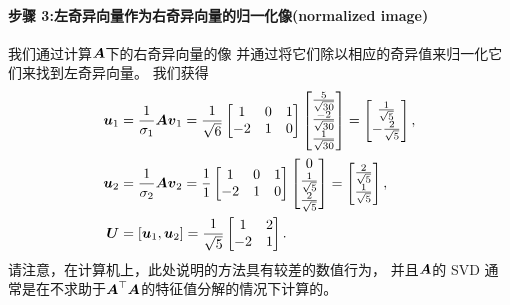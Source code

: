 \begin{example}[计算SVD]
\paragraph{步骤 3:左奇异向量作为右奇异向量的归一化像(normalized image)}
我们通过计算$\boldsymbol{A}$下的右奇异向量的像
并通过将它们除以相应的奇异值来归一化它们来找到左奇异向量。
我们获得
\begin{align}
    \boldsymbol{u}_1 &= \frac{1}{\sigma_1}\boldsymbol{A}\boldsymbol{v}_1 =
    \frac{1}{\sqrt{6}}
    \begin{bmatrix}
        1 & 0 & 1 \\
        -2 & 1 & 0
    \end{bmatrix}
    \begin{bmatrix}
        \frac{5}{\sqrt{30}} \\
        \frac{-2}{\sqrt{30}} \\
        \frac{1}{\sqrt{30}}
    \end{bmatrix} =
    \begin{bmatrix}
        \frac{1}{\sqrt{5}} \\
        -\frac{2}{\sqrt{5}}
    \end{bmatrix},\\
    \boldsymbol{u}_2 &= \frac{1}{\sigma_2}\boldsymbol{A}\boldsymbol{v}_2 =
    \frac{1}{1}
    \begin{bmatrix}
        1 & 0 & 1 \\
        -2 & 1 & 0
    \end{bmatrix}
    \begin{bmatrix}
        0 \\
        \frac{1}{\sqrt{5}} \\
        \frac{2}{\sqrt{5}}
    \end{bmatrix} =
    \begin{bmatrix}
        \frac{2}{\sqrt{5}} \\
        \frac{1}{\sqrt{5}}
    \end{bmatrix},\\
    \boldsymbol{U} &= [\boldsymbol{u}_1,\boldsymbol{u}_2] =
    \frac{1}{\sqrt{5}}
    \begin{bmatrix}
        1 & 2 \\
        -2 & 1
    \end{bmatrix}.
\end{align}
请注意，在计算机上，此处说明的方法具有较差的数值行为，
并且$\boldsymbol{A}$的 SVD 通常是在不求助于$\boldsymbol{A}^\top\boldsymbol{A}$的特征值分解的情况下计算的。
\end{example}

